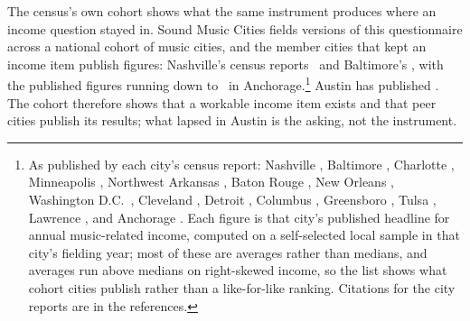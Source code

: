 The census's own cohort shows what the same instrument produces where an
income question stayed in. Sound Music Cities fields versions of this
questionnaire across a national cohort of music cities, and the member cities
that kept an income item publish figures: Nashville's census reports
\NCitycensusIncomeNashville\ and Baltimore's \NCitycensusIncomeBaltimore,
with the published figures running down to \NCitycensusIncomeAnchorage\ in
Anchorage.\footnote{As published by each city's census report: Nashville
\NCitycensusIncomeNashville, Baltimore \NCitycensusIncomeBaltimore, Charlotte
\NCitycensusIncomeCharlotte, Minneapolis \NCitycensusIncomeMinneapolis,
Northwest Arkansas \NCitycensusIncomeNwarkansas, Baton Rouge
\NCitycensusIncomeBatonRouge, New Orleans \NCitycensusIncomeNewOrleans,
Washington D.C.\ \NCitycensusIncomeWashingtonDc, Cleveland
\NCitycensusIncomeCleveland, Detroit \NCitycensusIncomeDetroit, Columbus
\NCitycensusIncomeColumbus, Greensboro \NCitycensusIncomeGreensboro, Tulsa
\NCitycensusIncomeTulsa, Lawrence \NCitycensusIncomeLawrence, and Anchorage
\NCitycensusIncomeAnchorage. Each figure is that city's published headline
for annual music-related income, computed on a self-selected local sample in
that city's fielding year; most of these are averages rather than medians,
and averages run above medians on right-skewed income, so the list shows what
cohort cities publish rather than a like-for-like ranking. Citations for the
city reports are in the references.} Austin has published
\NCitycensusAustinNoData. The cohort therefore shows that a workable income
item exists and that peer cities publish its results; what lapsed in Austin
is the asking, not the instrument.


